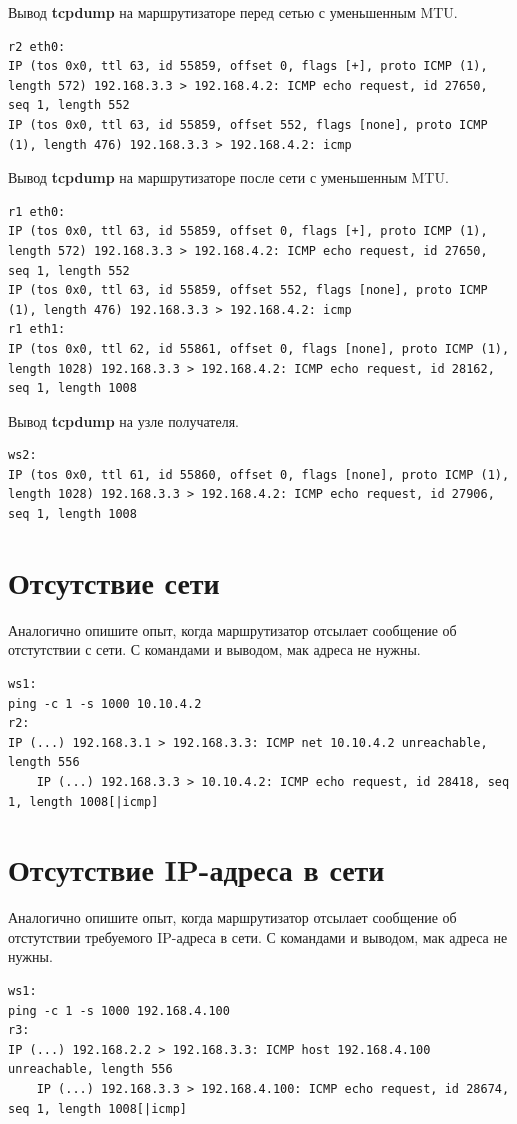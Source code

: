 \documentclass[a4paper,12pt]{article}
\begin{document}
Вывод \textbf{tcpdump} на маршрутизаторе перед сетью с уменьшенным MTU.


\begin{Verbatim}
r2 eth0:
IP (tos 0x0, ttl 63, id 55859, offset 0, flags [+], proto ICMP (1), length 572) 192.168.3.3 > 192.168.4.2: ICMP echo request, id 27650, seq 1, length 552
IP (tos 0x0, ttl 63, id 55859, offset 552, flags [none], proto ICMP (1), length 476) 192.168.3.3 > 192.168.4.2: icmp
\end{Verbatim}

Вывод \textbf{tcpdump} на маршрутизаторе после сети с уменьшенным MTU.


\begin{Verbatim}
r1 eth0:
IP (tos 0x0, ttl 63, id 55859, offset 0, flags [+], proto ICMP (1), length 572) 192.168.3.3 > 192.168.4.2: ICMP echo request, id 27650, seq 1, length 552
IP (tos 0x0, ttl 63, id 55859, offset 552, flags [none], proto ICMP (1), length 476) 192.168.3.3 > 192.168.4.2: icmp
r1 eth1:
IP (tos 0x0, ttl 62, id 55861, offset 0, flags [none], proto ICMP (1), length 1028) 192.168.3.3 > 192.168.4.2: ICMP echo request, id 28162, seq 1, length 1008
\end{Verbatim}


Вывод \textbf{tcpdump} на узле получателя.

\begin{Verbatim}
ws2:
IP (tos 0x0, ttl 61, id 55860, offset 0, flags [none], proto ICMP (1), length 1028) 192.168.3.3 > 192.168.4.2: ICMP echo request, id 27906, seq 1, length 1008
\end{Verbatim}


\section{Отсутствие сети}

Аналогично опишите опыт, когда маршрутизатор отсылает сообщение об отстутствии с сети.
С командами и выводом, мак адреса не нужны.
\begin{Verbatim}
ws1:
ping -c 1 -s 1000 10.10.4.2
r2:
IP (...) 192.168.3.1 > 192.168.3.3: ICMP net 10.10.4.2 unreachable, length 556
	IP (...) 192.168.3.3 > 10.10.4.2: ICMP echo request, id 28418, seq 1, length 1008[|icmp]
\end{Verbatim}

\section{Отсутствие IP-адреса в сети}

Аналогично опишите опыт, когда маршрутизатор отсылает сообщение об отстутствии требуемого IP-адреса в сети.
С командами и выводом, мак адреса не нужны.

\begin{Verbatim}
ws1:
ping -c 1 -s 1000 192.168.4.100
r3:
IP (...) 192.168.2.2 > 192.168.3.3: ICMP host 192.168.4.100 unreachable, length 556
	IP (...) 192.168.3.3 > 192.168.4.100: ICMP echo request, id 28674, seq 1, length 1008[|icmp]
\end{Verbatim}
\end{document}
